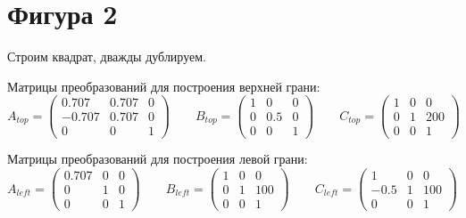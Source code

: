\newpage
\section[Фигура 2]{Фигура 2}

Строим квадрат, дважды дублируем.

Матрицы преобразований для построения верхней грани:
\begin{equation*}
    A_{top} = 
    \begin{pmatrix}
        0.707&  0.707& 0\\ 
        -0.707&  0.707& 0\\ 
        0&  0& 1
    \end{pmatrix} \hspace{24pt}
    B_{top} = 
    \begin{pmatrix} 
        1&  0& 0\\
        0&  0.5& 0\\
        0&  0& 1
    \end{pmatrix} \hspace{24pt}
    C_{top} = 
    \begin{pmatrix}
        1&  0& 0\\ 
        0&  1& 200\\ 
        0&  0& 1
    \end{pmatrix}
\end{equation*}


Матрицы преобразований для построения левой грани:
\begin{equation*}
    A_{left} = 
    \begin{pmatrix}
         0.707& 0& 0\\ 
         0& 1& 0\\ 
         0&  0& 1
    \end{pmatrix} \hspace{24pt}
    B_{left} = 
    \begin{pmatrix} 
        1& 0& 0\\
        0& 1& 100\\
        0& 0& 1
    \end{pmatrix} \hspace{24pt}
    C_{left}= 
    \begin{pmatrix}
        1&  0& 0\\ 
        -0.5&  1& 100\\ 
        0&  0& 1
    \end{pmatrix}
\end{equation*}

